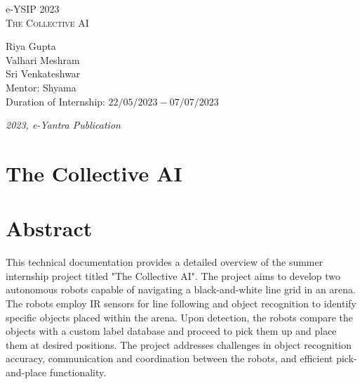 \documentclass[a4paper,12pt,oneside]{book}
\begin{document}
\begin{titlepage}
\raggedright
{\Large e-YSIP 2023\\[1cm]}
{\Huge\scshape The Collective AI \\[.1in]}
\vfill
\begin{flushright}
{\large Riya Gupta \\}
{\large Valhari Meshram \\}
{\large Sri Venkateshwar \\}
{\large Mentor: Shyama \\}
{\large Duration of Internship: $ 22/05/2023 - 07/07/2023 $ \\}
\end{flushright}

{\itshape 2023, e-Yantra Publication}
\end{titlepage}

\section[Abstract]{The Collective AI}
\section*{Abstract}
This technical documentation provides a detailed overview of the summer internship project titled "The Collective AI". The project aims to develop two autonomous robots capable of navigating a black-and-white line grid in an arena. The robots employ IR sensors for line following and object recognition to identify specific objects placed within the arena. Upon detection, the robots compare the objects with a custom label database and proceed to pick them up and place them at desired positions. The project addresses challenges in object recognition accuracy, communication and coordination between the robots, and efficient pick-and-place functionality.

\tableofcontents
\newpage
\end{document}
